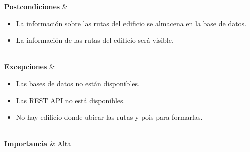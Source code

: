 {	\textbf{Postcondiciones} 		& 
	\begin{itemize}
		\item La información sobre las rutas del edificio se almacena en la base de datos.
		\item La información de las rutas del edificio será visible.
	\end{itemize}
	\\
	\textbf{Excepciones} 			& 
	\begin{itemize}
		\item Las bases de datos no están disponibles.
		\item Las REST API no está disponibles.
		\item No hay edificio donde ubicar las rutas y pois para formarlas.
	\end{itemize}
	
	\\
	\textbf{Importancia} 			& Alta\\}


